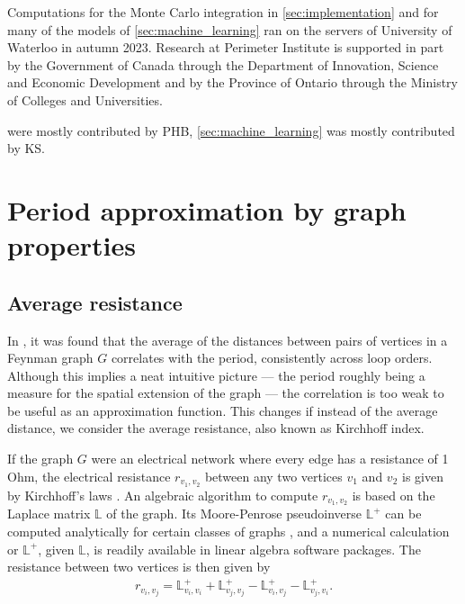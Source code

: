 \documentclass[11pt]{scrartcl}
\numberwithin{equation}{section}
\begin{document}
Computations for the Monte Carlo integration in \cref{sec:implementation} and for many of the models of \cref{sec:machine_learning} ran on the servers of University of Waterloo in autumn 2023. Research at Perimeter Institute is supported in part by the Government of Canada through the Department of
Innovation, Science and Economic Development and by the Province of Ontario through the Ministry of Colleges and Universities.

 were mostly contributed by PHB, \cref{sec:machine_learning} was mostly contributed by KS.




\newpage



\section{Period approximation by graph properties}\label{sec:estimation}



\subsection{Average resistance}\label{sec:resistance}
In \cite[Sec. 6]{balduf_statistics_2023}, it was found that the average of the distances between pairs of vertices in a Feynman graph $G$ correlates with the period, consistently across loop orders. Although this implies a neat intuitive picture --- the period roughly being a measure for the spatial extension of the graph --- the correlation is too weak to be useful as an approximation function. This changes if instead of the average distance, we consider the average resistance, also known as Kirchhoff index. 



If the graph $G$ were an electrical network where every edge has a resistance of 1 Ohm, the electrical resistance $r_{v_1,v_2}$  between any two vertices $v_1$ and $v_2$ is given by Kirchhoff's laws \cite{kirchhoff_ueber_1847}. An algebraic algorithm to compute $r_{v_1,v_2}$ is based on  the  Laplace matrix $\mathbb L$ of the graph. Its Moore-Penrose pseudoinverse  
$\mathbb L^+$ can be computed analytically for certain classes of graphs \cite{azimi_explicit_2023}, and a numerical calculation or $\mathbb L^+$, given $\mathbb L$, is readily available in linear algebra software packages. 
The resistance between two vertices is then  given by 
\begin{align*}
	r_{v_i,v_j}= \mathbb L^+_{v_i,v_i}+\mathbb L^+_{v_j,v_j}-\mathbb L^+_{v_i,v_j}-\mathbb L^+_{v_j,v_i}.
\end{align*}
\end{document}

